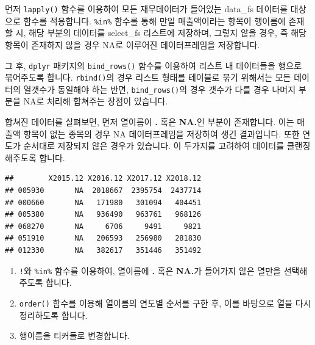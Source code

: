 \documentclass[12pt,]{book}
\newenvironment{Shaded}{\begin{snugshade}}{\end{snugshade}}
\newcommand{\KeywordTok}[1]{\textcolor[rgb]{0.13,0.29,0.53}{\textbf{#1}}}
\newcommand{\NormalTok}[1]{#1}
\newcommand{\OperatorTok}[1]{\textcolor[rgb]{0.81,0.36,0.00}{\textbf{#1}}}
\newcommand{\StringTok}[1]{\textcolor[rgb]{0.31,0.60,0.02}{#1}}
\providecommand{\tightlist}{%
  \setlength{\itemsep}{0pt}\setlength{\parskip}{0pt}}
\begin{document}
먼저 \texttt{lapply()} 함수를 이용하여 모든 재무데이터가 들어있는 data\_fs 데이터를 대상으로 함수를 적용합니다. \texttt{\%in\%} 함수를 통해 만일 매출액이라는 항목이 행이름에 존재할 시, 해당 부분의 데이터를 select\_fs 리스트에 저장하며, 그렇지 않을 경우, 즉 해당 항목이 존재하지 않을 경우 NA로 이루어진 데이터프레임을 저장합니다.

그 후, \texttt{dplyr} 패키지의 \texttt{bind\_rows()} 함수를 이용하여 리스트 내 데이터들을 행으로 묶어주도록 합니다. \texttt{rbind()}의 경우 리스트 형태를 테이블로 묶기 위해서는 모든 데이터의 열갯수가 동일해야 하는 반면, \texttt{bind\_rows()}의 경우 갯수가 다를 경우 나머지 부분을 NA로 처리해 합쳐주는 장점이 있습니다.

합쳐진 데이터를 살펴보면, 먼저 열이름이 \textbf{.} 혹은 \textbf{NA.}인 부분이 존재합니다. 이는 매출액 항목이 없는 종목의 경우 NA 데이터프레임을 저장하여 생긴 결과입니다. 또한 연도가 순서대로 저장되지 않은 경우가 있습니다. 이 두가지를 고려하여 데이터를 클랜징해주도록 합니다.

\begin{Shaded}
\end{Shaded}

\begin{verbatim}
##        X2015.12 X2016.12 X2017.12 X2018.12
## 005930       NA  2018667  2395754  2437714
## 000660       NA   171980   301094   404451
## 005380       NA   936490   963761   968126
## 068270       NA     6706     9491     9821
## 051910       NA   206593   256980   281830
## 012330       NA   382617   351446   351492
\end{verbatim}

\begin{enumerate}
\def\labelenumi{\arabic{enumi}.}
\tightlist
\item
  \texttt{!}와 \texttt{\%in\%} 함수를 이용하여, 열이름에 \textbf{.} 혹은 \textbf{NA.}가 들어가지 않은 열만을 선택해주도록 합니다.
\item
  \texttt{order()} 함수를 이용해 열이름의 연도별 순서를 구한 후, 이를 바탕으로 열을 다시 정리하도록 합니다.
\item
  행이름을 티커들로 변경합니다.
\end{enumerate}
\end{document}
